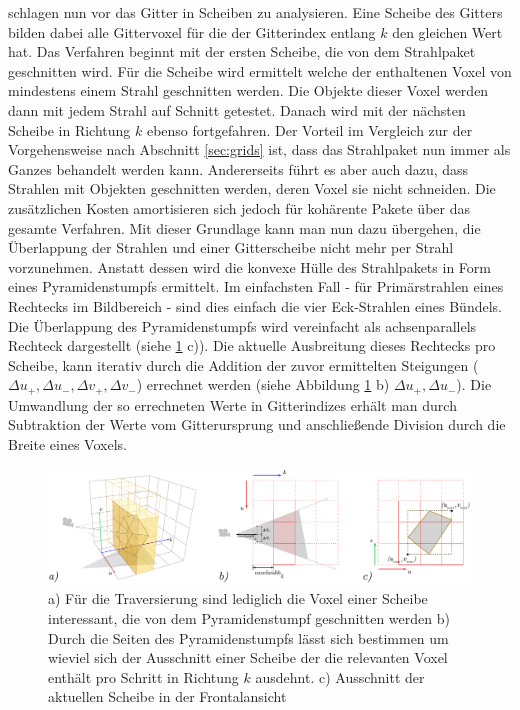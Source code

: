 \cite{WIKKP06} schlagen nun vor das Gitter in Scheiben zu analysieren. Eine Scheibe des Gitters bilden dabei alle  Gittervoxel für die der Gitterindex entlang $k$ den gleichen Wert hat. Das Verfahren beginnt mit der ersten Scheibe, die von dem Strahlpaket geschnitten wird. Für die Scheibe wird ermittelt welche der enthaltenen Voxel von mindestens einem Strahl geschnitten werden. Die Objekte dieser Voxel werden dann mit jedem Strahl auf Schnitt getestet. Danach wird mit der nächsten Scheibe in Richtung $k$ ebenso fortgefahren. Der Vorteil im Vergleich zur der Vorgehensweise nach Abschnitt \ref{sec:grids} ist, dass das Strahlpaket nun immer als Ganzes behandelt werden kann. Andererseits führt es aber auch dazu, dass Strahlen mit Objekten geschnitten werden, deren Voxel sie nicht schneiden. Die zusätzlichen Kosten amortisieren sich jedoch für kohärente Pakete über das gesamte Verfahren.
Mit dieser Grundlage kann man nun dazu übergehen, die Überlappung der Strahlen und einer Gitterscheibe nicht mehr per Strahl vorzunehmen. Anstatt dessen wird die konvexe Hülle des Strahlpakets in Form eines Pyramidenstumpfs ermittelt. Im einfachsten Fall - für Primärstrahlen eines Rechtecks im Bildbereich - sind dies einfach die vier Eck-Strahlen eines Bündels.
Die Überlappung des Pyramidenstumpfs wird vereinfacht als achsenparallels Rechteck dargestellt (siehe \ref{fig:gridslices} c)).
Die aktuelle Ausbreitung dieses Rechtecks pro Scheibe, kann iterativ durch die Addition der zuvor ermittelten Steigungen (${\Delta{u}}_+, {\Delta{u}}_-, {\Delta{v}}_+, {\Delta{v}}_-$) errechnet werden (siehe Abbildung \ref{fig:gridslices} b) ${\Delta{u}}_+, {\Delta{u}}_-$).
Die Umwandlung der so errechneten Werte in Gitterindizes erhält man durch Subtraktion der Werte vom Gitterursprung und anschließende Division durch die Breite eines Voxels.

\begin{figure}\centering
\includegraphics[width=1.0\textwidth]{images/gridslices.pdf} 
\caption[Scheibenbasierte Gittertraversierung]{a) Für die Traversierung sind lediglich die Voxel einer Scheibe interessant, die von dem Pyramidenstumpf geschnitten werden b) Durch die Seiten des Pyramidenstumpfs lässt sich bestimmen um wieviel sich der Ausschnitt einer Scheibe der die relevanten Voxel enthält pro Schritt in Richtung $k$ ausdehnt. c) Ausschnitt der aktuellen Scheibe in der Frontalansicht}
\label{fig:gridslices}
\end{figure}

